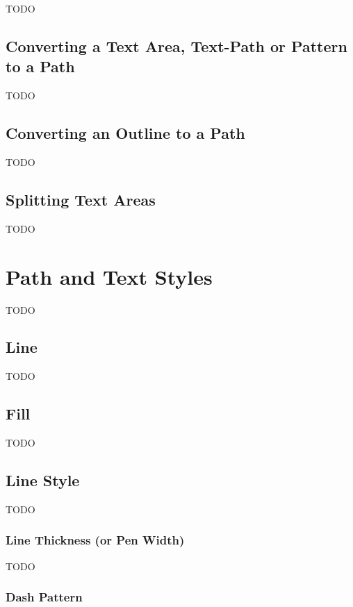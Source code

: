 TODO


\section{Converting a Text Area, Text-Path or Pattern to a Path}\label{sec:texttopath}

TODO


\section{Converting an Outline to a Path}\label{sec:outlinetopath}

TODO


\section{Splitting Text Areas}\label{sec:splittext}

TODO


\chapter{Path and Text Styles}\label{sec:styles}

TODO


\section{Line }\label{sec:linepaint}

TODO


\section{Fill }\label{sec:fillpaint}

TODO


\section{Line Style}\label{sec:pathstyle}

TODO


\subsection{Line Thickness (or Pen Width)}\label{sec:penwidth}

TODO


\subsection{Dash Pattern}\label{sec:dashpattern}

